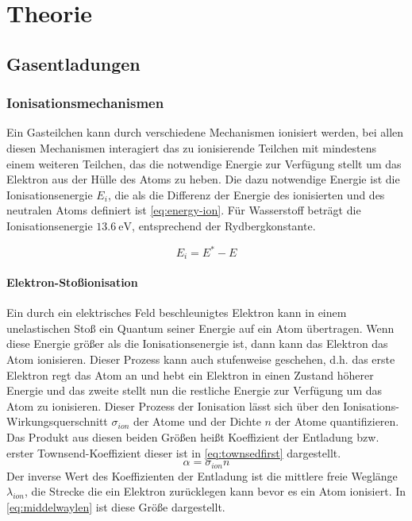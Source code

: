 \chapter{Theorie}
\label{chap:theory}

\section{Gasentladungen}
\label{sec:gasdischarges}
\subsection{Ionisationsmechanismen}
Ein Gasteilchen kann durch verschiedene Mechanismen ionisiert werden, bei allen diesen Mechanismen interagiert das zu ionisierende Teilchen mit mindestens einem weiteren Teilchen, das die notwendige Energie zur Verfügung stellt um das Elektron aus der Hülle des Atoms zu heben. Die dazu notwendige Energie ist die Ionisationsenergie \(E_i\), die als die Differenz der Energie des ionisierten und des neutralen Atoms definiert ist \eqref{eq:energy-ion}. Für Wasserstoff beträgt die Ionisationsenergie \(\SI{13,6}{\electronvolt}\), entsprechend der Rydbergkonstante.

\begin{equation}
    E_{i} = E^{*} - E
    \label{eq:energy-ion}
\end{equation}

\subsubsection{Elektron-Stoßionisation}
Ein durch ein elektrisches Feld beschleunigtes Elektron kann in einem unelastischen Stoß ein Quantum seiner Energie auf ein Atom übertragen. Wenn diese Energie größer als die Ionisationsenergie ist, dann kann das Elektron das Atom ionisieren. Dieser Prozess kann auch stufenweise geschehen, d.h. das erste Elektron regt das Atom an und hebt ein Elektron in einen Zustand höherer Energie und das zweite stellt nun die restliche Energie zur Verfügung um das Atom zu ionisieren. Dieser Prozess der Ionisation lässt sich über den Ionisations-Wirkungsquerschnitt \(\sigma_{ion}\) der Atome und der Dichte \(n\) der Atome quantifizieren. Das Produkt aus diesen beiden Größen heißt Koeffizient der Entladung bzw. erster Townsend-Koeffizient dieser ist in \eqref{eq:townsedfirst} dargestellt.
\begin{equation}
    \alpha = \sigma_{ion} n
    \label{eq:townsedfirst}
\end{equation}
Der inverse Wert des Koeffizienten der Entladung ist die mittlere freie Weglänge \(\lambda_{ion}\), die Strecke die ein Elektron zurücklegen kann bevor es ein Atom ionisiert. In \eqref{eq:middelwaylen} ist diese Größe dargestellt.

